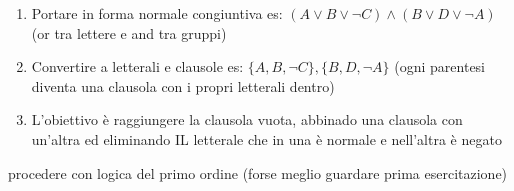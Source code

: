 \documentclass{article}
\begin{document}
 		\begin{enumerate}
 			\item Portare in forma normale congiuntiva es: \( (A\lor B \lor \neg C) \land (B \lor D \lor \neg A)\) (or tra lettere e and tra gruppi)
 			\item Convertire a letterali e clausole es: \( \{A,B,\neg C\},\{B,D,\neg A\}\) (ogni parentesi diventa una clausola con i propri letterali dentro)
 			\item L'obiettivo è raggiungere la clausola vuota, abbinado una clausola con un'altra ed eliminando IL letterale che in una è normale e nell'altra è negato
 		\end{enumerate}
 		
 		
 		procedere con logica del primo ordine (forse meglio guardare prima esercitazione)
	 	
	 	
		
		
		
		
		
		
\end{document}
